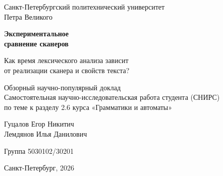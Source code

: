 \begin{titlepage}
\thispagestyle{empty}
\centering
{\large Санкт-Петербургский политехнический университет\\[3pt] Петра Великого\par}
\vspace{30mm}
{\sffamily\bfseries\fontsize{31}{37}\selectfont Экспериментальное\\сравнение сканеров\par}
\vspace{8mm}
{\Large Как время лексического анализа зависит\\[3pt] от реализации сканера и свойств текста?\par}
\vspace{13mm}
{\normalsize Обзорный научно-популярный доклад\\
Самостоятельная научно-исследовательская работа студента (СНИРС)\\
по теме к разделу 2.6 курса «Грамматики и автоматы»\par}
\vfill
{\large Гуцалов Егор Никитич\\[3pt] Лемдянов Илья Данилович\par}
\vspace{3mm}
Группа 5030102/30201\par
\vspace{18mm}
Санкт-Петербург, 2026
\end{titlepage}
\setcounter{page}{2}
